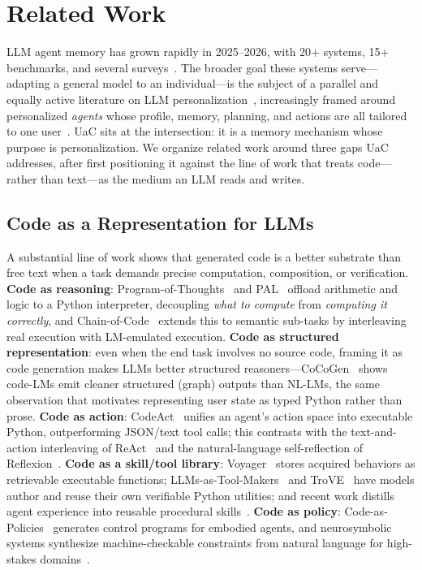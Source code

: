 \section{Related Work}
\label{sec:related}

LLM agent memory has grown rapidly in 2025--2026, with 20+ systems, 15+ benchmarks, and several surveys~\citep{hu2025memoryage, du2026memorysurvey, yang2026graphmemory, wu2025humantoai, zhang2024memorysurvey}. The broader goal these systems serve---adapting a general model to an individual---is the subject of a parallel and equally active literature on LLM personalization~\citep{zhang2024personalization, liu2025personalizedllm}, increasingly framed around personalized \emph{agents} whose profile, memory, planning, and actions are all tailored to one user~\citep{xu2026personalizedagents}. UaC sits at the intersection: it is a memory mechanism whose purpose is personalization. We organize related work around three gaps UaC addresses, after first positioning it against the line of work that treats code---rather than text---as the medium an LLM reads and writes.

\subsection{Code as a Representation for LLMs}
\label{sec:related-code}

A substantial line of work shows that generated code is a better substrate than free text when a task demands precise computation, composition, or verification. \textbf{Code as reasoning}: Program-of-Thoughts~\citep{chen2023pot} and PAL~\citep{gao2023pal} offload arithmetic and logic to a Python interpreter, decoupling \emph{what to compute} from \emph{computing it correctly}, and Chain-of-Code~\citep{li2024chainofcode} extends this to semantic sub-tasks by interleaving real execution with LM-emulated execution. \textbf{Code as structured representation}: even when the end task involves no source code, framing it as code generation makes LLMs better structured reasoners---CoCoGen~\citep{madaan2022cocogen} shows code-LMs emit cleaner structured (graph) outputs than NL-LMs, the same observation that motivates representing user state as typed Python rather than prose. \textbf{Code as action}: CodeAct~\citep{wang2024codeact} unifies an agent's action space into executable Python, outperforming JSON/text tool calls; this contrasts with the text-and-action interleaving of ReAct~\citep{yao2023react} and the natural-language self-reflection of Reflexion~\citep{shinn2023reflexion}. \textbf{Code as a skill/tool library}: Voyager~\citep{wang2024voyager} stores acquired behaviors as retrievable executable functions; LLMs-as-Tool-Makers~\citep{cai2023latm} and TroVE~\citep{wang2024trove} have models author and reuse their own verifiable Python utilities; and recent work distills agent experience into reusable procedural skills~\citep{mi2026skillpro}. \textbf{Code as policy}: Code-as-Policies~\citep{liang2023codeaspolicies} generates control programs for embodied agents, and neurosymbolic systems synthesize machine-checkable constraints from natural language for high-stakes domains~\citep{akinfaderin2025verafi}.

